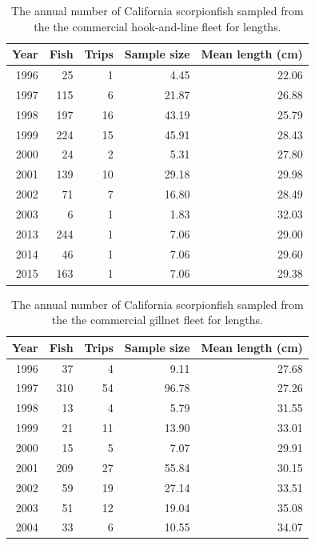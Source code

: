 \documentclass[12pt,]{article}
\begin{document}
\begin{table}[ht]
\centering
\caption{The annual number of California scorpionfish 
                                              sampled from the the commercial hook-and-line 
                                            fleet for lengths.} 
\label{tab:ComHL_lengthsample}
\begin{tabular}{rrrrr}
  \hline
Year & Fish & Trips & Sample size & Mean length (cm) \\ 
  \hline
1996 &  25 &   1 & 4.45 & 22.06 \\ 
  1997 & 115 &   6 & 21.87 & 26.88 \\ 
  1998 & 197 &  16 & 43.19 & 25.79 \\ 
  1999 & 224 &  15 & 45.91 & 28.43 \\ 
  2000 &  24 &   2 & 5.31 & 27.80 \\ 
  2001 & 139 &  10 & 29.18 & 29.98 \\ 
  2002 &  71 &   7 & 16.80 & 28.49 \\ 
  2003 &   6 &   1 & 1.83 & 32.03 \\ 
  2013 & 244 &   1 & 7.06 & 29.00 \\ 
  2014 &  46 &   1 & 7.06 & 29.60 \\ 
  2015 & 163 &   1 & 7.06 & 29.38 \\ 
   \hline
\end{tabular}
\end{table}\begin{table}[ht]
\centering
\caption{The annual number of California scorpionfish 
                                              sampled from the the commercial gillnet 
                                            fleet for lengths.} 
\label{tab:ComNet_lengthsample}
\begin{tabular}{rrrrr}
  \hline
Year & Fish & Trips & Sample size & Mean length (cm) \\ 
  \hline
1996 &  37 &   4 & 9.11 & 27.68 \\ 
  1997 & 310 &  54 & 96.78 & 27.26 \\ 
  1998 &  13 &   4 & 5.79 & 31.55 \\ 
  1999 &  21 &  11 & 13.90 & 33.01 \\ 
  2000 &  15 &   5 & 7.07 & 29.91 \\ 
  2001 & 209 &  27 & 55.84 & 30.15 \\ 
  2002 &  59 &  19 & 27.14 & 33.51 \\ 
  2003 &  51 &  12 & 19.04 & 35.08 \\ 
  2004 &  33 &   6 & 10.55 & 34.07 \\ 

\end{tabular}
\end{table}
\end{document}
